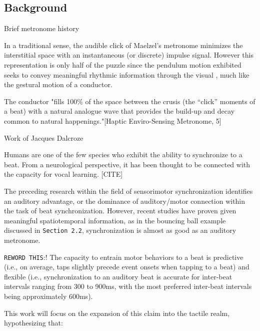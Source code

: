 \subsection{Background}
Brief metronome history

In a traditional sense, the audible click of Maelzel's metronome minimizes the interstitial space with an instantaneous (or discrete) impulse signal. However this representation is only half of the puzzle since the pendulum motion exhibited seeks to convey meaningful rhythmic information through the visual , much like the gestural motion of a conductor.

The conductor "fills 100\% of the space between the crusis (the “click” moments of a beat) with a natural analogue wave that provides the build-up and decay common to natural happenings."[Haptic Enviro-Sensing Metronome, 5]

Work of Jacques Dalcroze

Humans are one of the few species who exhibit the ability to synchronize to a beat. From a neurological perspective, it has been thought to be connected with the capacity for vocal learning. [CITE]

The preceding research within the field of sensorimotor synchronization identifies an auditory advantage, or the dominance of auditory/motor connection within the task of beat synchronization. However, recent studies have proven given meaningful spatiotemporal information, as in the bouncing ball example discussed in \verb!Section 2.2!, synchronization is almost as good as an auditory metronome.

\verb!REWORD THIS!:!
The capacity to entrain motor behaviors to a beat is predictive (i.e., on average, taps slightly precede event onsets when tapping to a beat) and flexible (i.e., synchronization to an auditory beat is accurate for inter-beat intervals ranging from 300 to 900ms, with the most preferred inter-beat intervals being approximately 600ms).~\cite{repp2013sensorimotor}

This work will focus on the expansion of this claim into the tactile realm, hypothesizing that:
